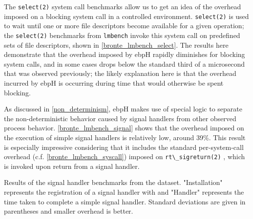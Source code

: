 \documentclass[
  12pt]{findlay}
\newcommand{\passthrough}[1]{#1}
\begin{document}
The \passthrough{\lstinline!select(2)!} system call benchmarks allow us
to get an idea of the overhead imposed on a blocking system call in a
controlled environment. \passthrough{\lstinline!select(2)!}
\autocite{man_select} is used to wait until one or more file descriptors
become available for a given operation; the
\passthrough{\lstinline!select(2)!} benchmarks from
\passthrough{\lstinline!lmbench!} invoke this system call on predefined
sets of file descriptors, shown in \autoref{bronte_lmbench_select}. The
results here demonstrate that the overhead imposed by ebpH rapidly
diminishes for blocking system calls, and in some cases drops below the
standard third of a microsecond that was observed previously; the likely
explanation here is that the overhead incurred by ebpH is occurring
during time that would otherwise be spent blocking.

\FloatBarrier

As discussed in \autoref{non_determinism}, ebpH makes use of special
logic to separate the non-deterministic behavior caused by signal
handlers from other observed process behavior.
\autoref{bronte_lmbench_signal} shows that the overhead imposed on the
execution of simple signal handlers is relatively low, around 39\%. This
result is especially impressive considering that it includes the
standard per-system-call overhead (c.f.
\autoref{bronte_lmbench_syscall}) imposed on
\passthrough{\lstinline!rt\_sigreturn(2)!} \autocite{man_sigreturn},
which is invoked upon return from a signal handler.

\begin{table}
    \caption[Results of the signal handler benchmarks from the  dataset]{
        Results of the signal handler benchmarks from the  dataset.
        "Installation" represents the registration of a signal handler with  and
        "Handler" represents the time taken to complete a simple signal handler.
        Standard deviations are given in parentheses and smaller overhead is better.
    }
    \label{bronte_lmbench_signal}
    
\end{table}
\end{document}
